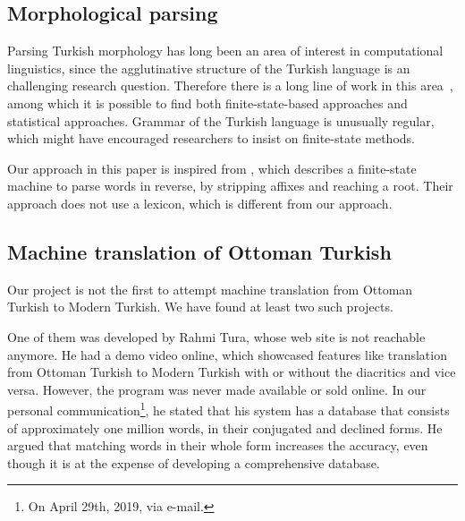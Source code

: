 \documentclass[10pt,twocolumn]{article}
\theoremstyle{nonumberplain}
\begin{document}
\subsection{Morphological parsing}

Parsing Turkish morphology has long been an area of interest in computational
linguistics, since the agglutinative structure of the Turkish language
is an challenging research question. Therefore there is a long line of work in this area~\cite{hankamer1986finite, solak1992parsing, oflazer1994two, oflazer1994outline, hakkani2002statistical, eryigit2004affix, sak2007morphological, sak2009stochastic, coltekin2010freely}, among which it is possible to find both finite-state-based approaches and statistical approaches.
Grammar of the Turkish language is unusually regular, which might have
encouraged researchers to insist on finite-state methods.

Our approach in this paper is inspired from \citet{eryigit2004affix}, which
describes a finite-state machine to parse words in reverse, by stripping
affixes and reaching a root. Their approach does not use a lexicon, which is
different from our approach.

\subsection{Machine translation of Ottoman Turkish}

Our project is not the first to attempt machine translation from Ottoman
Turkish to Modern Turkish. We have found at least two such projects.

One of them was developed by Rahmi Tura, whose web site is not
reachable anymore. He had a demo video online, which showcased features like
translation from Ottoman Turkish to Modern Turkish with or without the
diacritics and vice versa. However, the program was never made available or
sold online. In our personal communication\footnote{On April 29th, 2019, via e-mail.}, he stated that
his system has a database that consists of approximately one million words, in
their conjugated and declined forms. He argued that matching words in their
whole form increases the accuracy, even though it is at the expense of
developing a comprehensive database.
\end{document}
